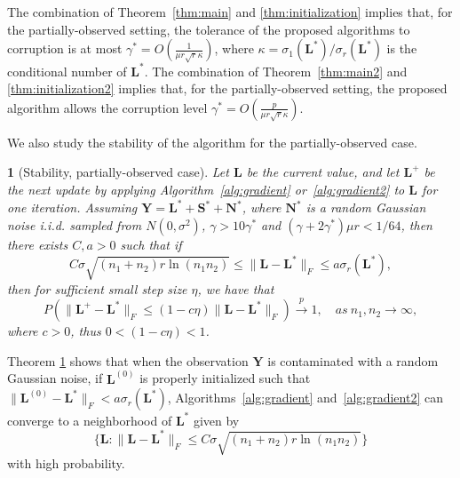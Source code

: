 \documentclass[12pt]{article}
\newcommand{\bL}{\boldsymbol{L}}
\newcommand{\bP}{\boldsymbol{P}}
\def\bS{\boldsymbol{S}}
\def\bP{\boldsymbol{P}}
\def\bY{\boldsymbol{Y}}
\def\bN{\boldsymbol{N}}
\theoremstyle{plain}
\theoremstyle{definition}
\theoremstyle{plain}
\newtheorem{thm}{\protect\theoremname}
\theoremstyle{plain}
\theoremstyle{remark}
\providecommand{\theoremname}{Theorem}
\begin{document}
The combination of Theorem~\ref{thm:main} and \ref{thm:initialization}  implies that, for the partially-observed setting,  the tolerance of the proposed algorithms to corruption is at most  $\gamma^* =O(\frac{1}{\mu r \sqrt{r} \kappa})$, where $\kappa=\sigma_1(\bL^*)/\sigma_r(\bL^*)$ is the conditional number of $\bL^*$. The combination of Theorem~\ref{thm:main2} and \ref{thm:initialization2} implies that, for the partially-observed setting, the proposed algorithm allows the corruption level $\gamma^* =O(\frac{p}{\mu r \sqrt{r} \kappa})$.
 
We also study the stability of the algorithm for the partially-observed case. 
\begin{thm}[Stability, partially-observed case]\label{thm:noisy}
Let $\bL$ be the current value, and let $\bL^+$ be the next update by applying Algorithm~\ref{alg:gradient} or~\ref{alg:gradient2} to $\bL$ for one iteration. Assuming  $\bY=\bL^*+\bS^*+\bN^*$, where $\bN^*$ is a random Gaussian noise i.i.d. sampled from $N(0,\sigma^2)$, $\gamma>10\gamma^*$ and  $(\gamma+2\gamma^*)\mu r < 1/64$, then there exists  $C,a>0$ such that if 
\[
C\sigma \sqrt{(n_1+n_2)r\ln(n_1n_2)}\leq \|\bL-\bL^*\|_F\leq a\sigma_r(\bL^*),
\] then for sufficient small step size $\eta$, we have that
\[
P(\|\bL^+-\bL^*\|_F\leq \left(1-c \eta \right) \|\bL-\bL^*\|_F) \overset{p}{\rightarrow} 1,\quad as\ n_1,n_2\rightarrow\infty,
\]
where $c>0$, thus $0<(1-c\eta)<1$.
\end{thm}
Theorem \ref{thm:noisy} shows that when the observation $\bY$ is contaminated with a random Gaussian noise, if  $\bL^{(0)}$ is properly initialized such that $\|\bL^{(0)}-\bL^*\|_F<a\sigma_r(\bL^*)$, Algorithms~\ref{alg:gradient} and~\ref{alg:gradient2} can converge to a neighborhood of $\bL^*$ given by \[\{\bL:  \|\bL-\bL^*\|_F\leq C\sigma \sqrt{(n_1+n_2)r\ln(n_1n_2)}\}\] with high probability.


\end{document}
